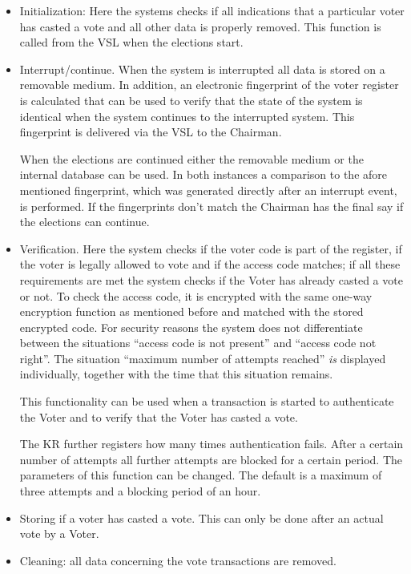 \begin{itemize}
	\item Initialization: Here the systems checks if all
	indications that a particular voter has casted a vote and all
	other data is properly removed. This function is called from
	the VSL when the elections start.

	\item Interrupt/continue. When the system is interrupted all
	data is stored on a removable medium. In addition, an
	electronic fingerprint of the voter register is calculated
	that can be used to verify that the state of the system is
	identical when the system continues to the interrupted
	system. This fingerprint is delivered via the VSL to the
	Chairman.

	When the elections are continued either the removable medium
	or the internal database can be used. In both instances a
	comparison to the afore mentioned fingerprint, which was
	generated directly after an interrupt event, is performed. If
	the fingerprints don't match the Chairman has the final say if
	the elections can continue.

	\item Verification. Here the system checks if the voter code
	is part of the register, if the voter is legally allowed to
	vote and if the access code matches; if all these requirements
	are met the system checks if the Voter has already casted a
	vote or not. To check the access code, it is encrypted with the
	same one-way encryption function as mentioned before and
	matched with the stored encrypted code. For security reasons
	the system does not differentiate between the situations
	``access code is not present'' and ``access code not
	right''. The situation ``maximum number of attempts reached''
	\emph{is} displayed individually, together with the time that
	this situation remains.

	This functionality can be used when a transaction is started
	to authenticate the Voter and to verify that the Voter has
	casted a vote.

	The KR further registers how many times authentication
	fails. After a certain number of attempts all further attempts
	are blocked for a certain period. The parameters of this
	function can be changed. The default is a maximum of three
	attempts and a blocking period of an hour.

	\item Storing if a voter has casted a vote. This can only be
	done after an actual vote by a Voter.

	\item Cleaning: all data concerning the vote transactions are
	removed.

\end{itemize}

